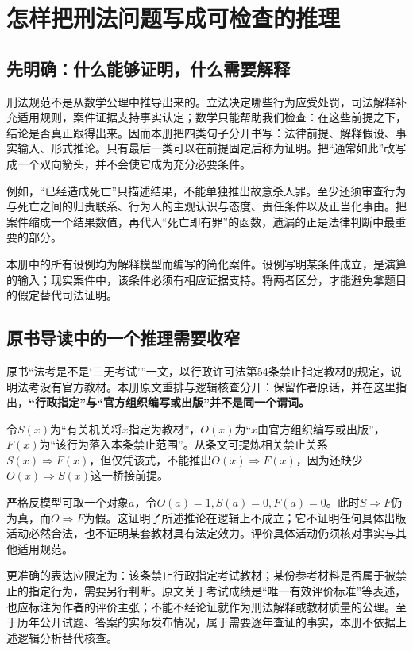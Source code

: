 \chapter{怎样把刑法问题写成可检查的推理}
\formalstatus

\section{先明确：什么能够证明，什么需要解释}
刑法规范不是从数学公理中推导出来的。立法决定哪些行为应受处罚，司法解释补充适用规则，案件证据支持事实认定；数学只能帮助我们检查：在这些前提之下，结论是否真正跟得出来。因而本册把四类句子分开书写：法律前提、解释假设、事实输入、形式推论。只有最后一类可以在前提固定后称为证明。把“通常如此”改写成一个双向箭头，并不会使它成为充分必要条件。

例如，“已经造成死亡”只描述结果，不能单独推出故意杀人罪。至少还须审查行为与死亡之间的归责联系、行为人的主观认识与态度、责任条件以及正当化事由。把案件缩成一个结果数值，再代入“死亡即有罪”的函数，遗漏的正是法律判断中最重要的部分。

本册中的所有设例均为解释模型而编写的简化案件。设例写明某条件成立，是演算的输入；现实案件中，该条件必须有相应证据支持。将两者区分，才能避免拿题目的假定替代司法证明。

\section{原书导读中的一个推理需要收窄}
原书“法考是不是‘三无考试’”一文，以行政许可法第54条禁止指定教材的规定，说明法考没有官方教材。本册原文重排与逻辑核查分开：保留作者原话，并在这里指出，\textbf{“行政指定”与“官方组织编写或出版”并不是同一个谓词。}

令$S(x)$为“有关机关将$x$指定为教材”，$O(x)$为“$x$由官方组织编写或出版”，$F(x)$为“该行为落入本条禁止范围”。从条文可提炼相关禁止关系$S(x)\Rightarrow F(x)$，但仅凭该式，不能推出$O(x)\Rightarrow F(x)$，因为还缺少$O(x)\Rightarrow S(x)$这一桥接前提。

严格反模型可取一个对象$a$，令$O(a)=1,S(a)=0,F(a)=0$。此时$S\Rightarrow F$仍为真，而$O\Rightarrow F$为假。这证明了所述推论在逻辑上不成立；它不证明任何具体出版活动必然合法，也不证明某套教材具有法定效力。评价具体活动仍须核对事实与其他适用规范。

更准确的表达应限定为：该条禁止行政指定考试教材；某份参考材料是否属于被禁止的指定行为，需要另行判断。原文关于考试成绩是“唯一有效评价标准”等表述，也应标注为作者的评价主张；不能不经论证就作为刑法解释或教材质量的公理。至于历年公开试题、答案的实际发布情况，属于需要逐年查证的事实，本册不依据上述逻辑分析替代核查。

